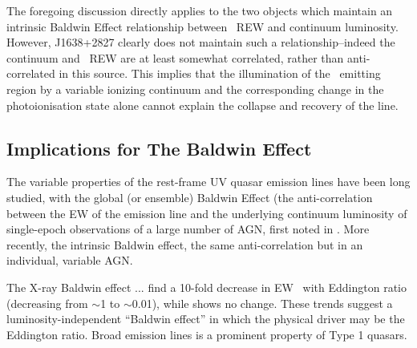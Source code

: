 \documentclass[fleqn,usenatbib]{mnras}
\begin{document}
The foregoing discussion directly applies to the two objects which maintain an intrinsic Baldwin Effect relationship between \civ\ REW and continuum luminosity. However, J1638+2827 clearly does not maintain such a relationship--indeed the continuum and \civ\ REW are at least somewhat correlated, rather than anti-correlated in this source. This implies that the illumination of the \civ\ emitting region by a variable ionizing continuum and the corresponding change in the photoionisation state alone cannot explain the collapse and recovery of the line.

\subsection{Implications for The Baldwin Effect}
The variable properties of the rest-frame UV quasar emission lines have been long studied, with the global (or ensemble) Baldwin Effect (the anti-correlation between the EW of the emission line and the underlying continuum luminosity of single-epoch observations of a large number of AGN, first noted in \citet{Baldwin1977}.  More recently, the intrinsic Baldwin effect, the same anti-correlation but in an individual, variable AGN.  

The X-ray Baldwin effect \citep[e.g., ][]{Iwasawa_Taniguchi1993}... \citet{Bachev2004} find a 10-fold decrease in EW \civ\ with Eddington ratio (decreasing from $\sim$1 to $\sim$0.01), while \nv shows no change. These trends suggest a luminosity-independent ``Baldwin effect'' in which the physical driver may be the Eddington ratio. \citet{Ge2016} Broad emission lines is a prominent property of Type 1 quasars. 
\end{document}
